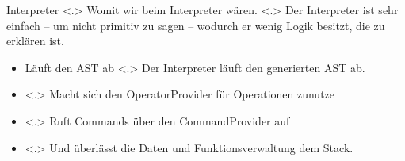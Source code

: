   \begin{frame}{Interpreter}
    \pause
        \note[item]<.>{
          Womit wir beim Interpreter wären.
        }
        \note[item]<.>{
          Der Interpreter ist sehr einfach -- um nicht primitiv zu sagen -- wodurch er wenig Logik besitzt, die zu erklären ist.
        }
    \begin{itemize}[<+- | alert@+>]
      \item Läuft den AST ab
          \note[item]<.>{
            Der Interpreter läuft den generierten AST ab.
          }
      \item {}
          \note[item]<.>{
            Macht sich den OperatorProvider für Operationen zunutze
          }
      \item {}
          \note[item]<.>{
            Ruft Commands über den CommandProvider auf
          }
      \item {}
          \note[item]<.>{
            Und überlässt die Daten und Funktionsverwaltung dem Stack.
          }
    \end{itemize}
  \end{frame}


